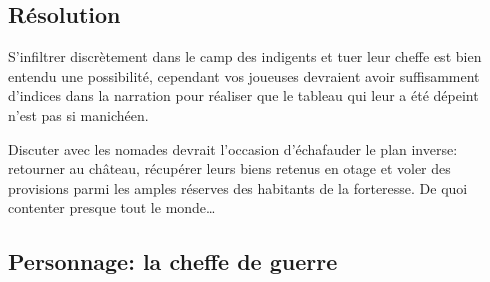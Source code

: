 \subsection{Résolution}

S'infiltrer discrètement dans le camp des indigents et tuer leur cheffe est bien entendu une possibilité, cependant vos joueuses devraient avoir suffisamment d'indices dans la narration pour réaliser que le tableau qui leur a été dépeint n'est pas si manichéen.

Discuter avec les nomades devrait l'occasion d'échafauder le plan inverse: retourner au château, récupérer leurs biens retenus en otage et voler des provisions parmi les amples réserves des habitants de la forteresse. De quoi contenter presque tout le monde\dots

\subsection*{Personnage: la cheffe de guerre}

\vfill
{}
\vfill
